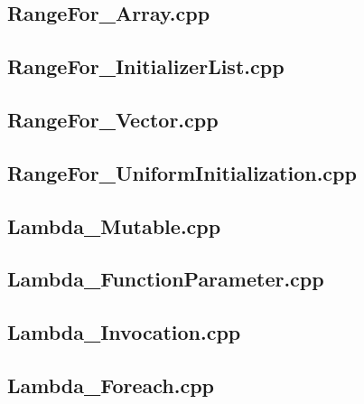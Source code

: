 \documentclass[11pt]{report}
\begin{document}
\begin{appendix}
\subsection{RangeFor\_Array.cpp}
\label{RangeFor_Array}


\subsection{RangeFor\_InitializerList.cpp}
\label{RangeFor_InitializerList}


\subsection{RangeFor\_Vector.cpp}
\label{RangeFor_Vector}


\subsection{RangeFor\_UniformInitialization.cpp}
\label{RangeFor_UniformInitialization}


\subsection{Lambda\_Mutable.cpp}
\label{Lambda_Mutable}


\subsection{Lambda\_FunctionParameter.cpp}
\label{Lambda_FunctionParameter}


\subsection{Lambda\_Invocation.cpp}
\label{Lambda_Invocation}


\subsection{Lambda\_Foreach.cpp}
\label{Lambda_Foreach}



\end{appendix}
\end{document}

